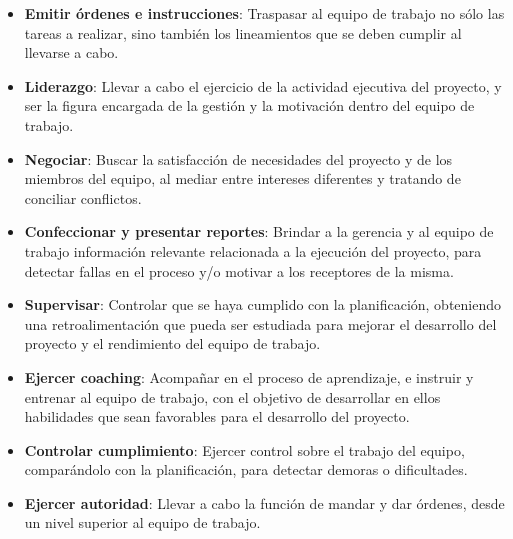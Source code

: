 \begin{itemize}
                \item \textbf{Emitir órdenes e instrucciones}:
                Traspasar al equipo de trabajo no sólo las tareas a realizar, sino también los lineamientos que se deben cumplir al llevarse a cabo.
                
                \item \textbf{Liderazgo}:
                Llevar a cabo el ejercicio de la actividad ejecutiva del proyecto, y ser la figura encargada de la gestión y la motivación dentro del equipo de trabajo.
                
                \item \textbf{Negociar}:
                Buscar la satisfacción de necesidades del proyecto y de los miembros del equipo, al mediar entre intereses diferentes y tratando de conciliar conflictos.
                
                \item \textbf{Confeccionar y presentar reportes}:
                Brindar a la gerencia y al equipo de trabajo información relevante relacionada a la ejecución del proyecto, para detectar fallas en el proceso y/o motivar a los receptores de la misma.
                
                \item \textbf{Supervisar}:
                Controlar que se haya cumplido con la planificación, obteniendo una retroalimentación que pueda ser estudiada para mejorar el desarrollo del proyecto y el rendimiento del equipo de trabajo.
                
                \item \textbf{Ejercer coaching}:
                Acompañar en el proceso de aprendizaje, e instruir y entrenar al equipo de trabajo, con el objetivo de desarrollar en ellos habilidades que sean favorables para el desarrollo del proyecto.
                
                \item \textbf{Controlar cumplimiento}:
                Ejercer control sobre el trabajo del equipo, comparándolo con la planificación, para detectar demoras o dificultades.
                
                \item \textbf{Ejercer autoridad}:
                Llevar a cabo la función de mandar y dar órdenes, desde un nivel superior al equipo de trabajo.
            \end{itemize}
        
